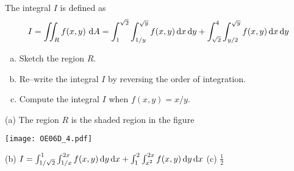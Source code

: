 \begin{question}[M200 2006D] %
The integral $I$ is defined as
\begin{equation*}
I =\iint_R f(x,y)\ \mathrm{d}A
  = \int_1^{\sqrt{2}} \int_{1/y}^{\sqrt{y}} f(x,y)\,\mathrm{d}x\,\mathrm{d}y
    +\int_{\sqrt{2}}^4 \int_{y/2}^{\sqrt{y}} f(x,y)\,\mathrm{d}x\,\mathrm{d}y
\end{equation*}


\begin{enumerate}[(a)]
\item
 Sketch the region $R$.

\item
 Re--write the integral $I$ by reversing the order of integration.

\item Compute the integral $I$ when $f(x,y)= x/y$.
\end{enumerate}
\end{question}

%

\begin{answer}
(a) The region $R$ is the shaded region in the figure

\begin{center}
     \texttt{[image: OE06D\_4.pdf]}
\end{center}

(b) $I= \int_{1/\sqrt{2}}^1 \int_{1/x}^{2x} f(x,y)\,\mathrm{d}y\,\mathrm{d}x
    +\int_1^2 \int_{x^2}^{2x} f(x,y)\,\mathrm{d}y\,\mathrm{d}x$ \qquad
(c) $\frac{1}{2}$
\end{answer}

